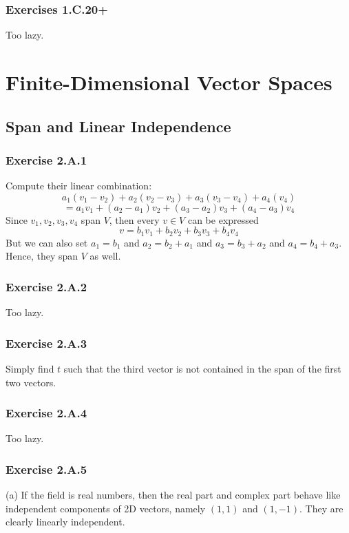 \documentclass{book}
\begin{document}
\subsection*{Exercises 1.C.20+}
Too lazy.

\chapter{Finite-Dimensional Vector Spaces}

\section{Span and Linear Independence}

\subsection*{Exercise 2.A.1}
Compute their linear combination:
$$a_1 (v_1 - v_2) + a_2 (v_2 - v_3) + a_3 (v_3 - v_4) + a_4 (v_4)$$
$$= a_1 v_1 + (a_2 - a_1) v_2 + (a_3 - a_2) v_3 + (a_4 - a_3) v_4$$
Since $v_1, v_2, v_3, v_4$ span $V$, then every $v \in V$ can be expressed
$$v = b_1 v_1 + b_2 v_2 + b_3 v_3 + b_4 v_4$$
But we can also set $a_1 = b_1$ and $a_2 = b_2 + a_1$ and $a_3 = b_3 + a_2$ and $a_4 = b_4 + a_3$. Hence, they span $V$ as well.

\subsection*{Exercise 2.A.2}
Too lazy.

\subsection*{Exercise 2.A.3}
Simply find $t$ such that the third vector is not contained in the span of the first two vectors.

\subsection*{Exercise 2.A.4}
Too lazy.

\subsection*{Exercise 2.A.5}
(a)
If the field is real numbers, then the real part and complex part behave like independent components of 2D vectors, namely $(1, 1)$ and $(1, -1)$. They are clearly linearly independent.
\end{document}
